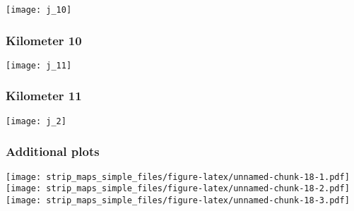 \documentclass[]{article}
\begin{document}
\texttt{[image: j\_10]}

\subsubsection{Kilometer 10}\label{kilometer-10-5}

\texttt{[image: j\_11]}

\subsubsection{Kilometer 11}\label{kilometer-11-2}

\texttt{[image: j\_2]}

\subsubsection{Additional plots}\label{additional-plots-9}

\texttt{[image: strip\_maps\_simple\_files/figure-latex/unnamed-chunk-18-1.pdf]}
\texttt{[image: strip\_maps\_simple\_files/figure-latex/unnamed-chunk-18-2.pdf]}
\texttt{[image: strip\_maps\_simple\_files/figure-latex/unnamed-chunk-18-3.pdf]}
\end{document}
